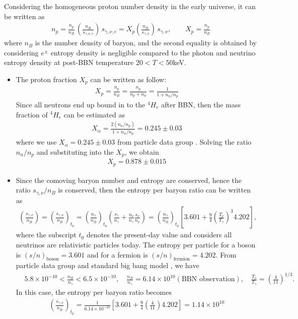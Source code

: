 \documentclass[Universe,article,submit,moreauthors,pdftex]{Definitions/mdpi}
\begin{document}
Considering the homogeneous proton number density in the early universe, it can be written as
\begin{align}\label{density_proton}
n_p=\frac{n_p}{n_B}\,\left(\frac{n_B}{s_{\gamma,\nu,e}}\right)\,s_{\gamma,\nu,e}= X_p\left(\frac{n_B}{s_{\gamma,\nu}}\right)\,s_{\gamma,\nu},\qquad X_p=\frac{n_p}{n_B}
\end{align}
where $n_B$ is the number density of baryon, and the second equality is obtained by considering $e^\pm$ entropy density is negligible compared to the photon and neutrino entropy density at post-BBN temperature $20<T<50$keV. 
\begin{itemize}

  \item The proton fraction $X_p$ can be written as follow:
  \begin{align}
  X_p=\frac{n_p}{n_B}=\frac{n_p}{n_p+n_n}=\frac{1}{1+n_n/n_p}
  \end{align}
Since all neutrons end up bound in to the $^4H_e$ after BBN, then the mass fraction of $^4H_e$ can be estimated as 
\begin{align}
X_\alpha=\frac{2(n_n/n_p)}{1+n_n/n_p}=0.245\pm0.03
\end{align} 
where we use $X_\alpha=0.245\pm0.03$ from particle data group \cite{ParticleDataGroup:2022pth}. Solving the ratio $n_n/n_p$ and substituting into the $X_p$, we obtain
\begin{align}
X_p=0.878\pm0.015
\end{align}

  \item Since the comoving baryon number and entropy are conserved, hence the ratio $s_{\gamma,\nu}/n_B$ is conserved, then the entropy per baryon ratio can be written as
\begin{align}
\left(\frac{s_{\gamma,\nu}}{n_B}\right)=\left(\frac{s_{\gamma,\nu}}{n_B}\right)_{\!\!t_0}\!\!=\left(\frac{n_\gamma}{n_B}\right)_{\!\!t_0}\left(\frac{s_\gamma}{n_\gamma}+\frac{n_\nu}{n_\gamma}\frac{s_\nu}{n_\nu}\right)=\left(\frac{n_\gamma}{n_B}\right)_{\!\!t_0}\left[3.601+\frac{9}{4}\left(\frac{T_\nu}{T_\gamma}\right)^{\!\!3}4.202\right],
\end{align}
where the subscript $t_0$ denotes the present-day value and considers all neutrinos are relativistic particles today. The entropy per particle for a boson is $(s/n)_\mathrm{boson}=3.601$ and for a fermion is $(s/n)_\mathrm{fermion}=4.202$. From particle data group and standard big bang model \cite{ParticleDataGroup:2022pth,Kolb:1990vq}, we have
\begin{align}
&5.8\times10^{-10}<\frac{n_B}{n_\gamma}<6.5\times10^{-10},\quad\frac{n_B}{n_\gamma}=6.14\times10^{10}(\mathrm{BBN\,\,observation}),\quad\frac{T_\nu}{T_\gamma}=\left(\frac{4}{11}\right)^{1/3}.
\end{align}
In this case, the entropy per baryon ratio  becomes
\begin{align}
\left(\frac{s_{\gamma,\nu}}{n_B}\right)_{\!\!t_0}=\frac{1}{6.14\times10^{-10}}\left[3.601+\frac{9}{4}\left(\frac{4}{11}\right)4.202\right]=1.14\times10^{10}
\end{align}


\end{itemize}
\end{document}
